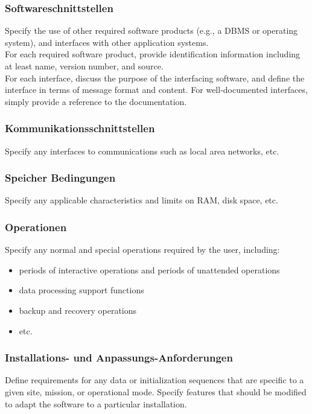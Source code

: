 \subsubsection{Softwareschnittstellen}
Specify the use of other required software products (e.g., a DBMS or operating system), and interfaces with other application systems. \\[-0.3cm]

\noindent For each required software product, provide identification information including at least name, version number, and source. \\[-0.3cm]

\noindent For each interface, discuss the purpose of the interfacing software, and define the interface in terms of message format and content. For well-documented interfaces, simply provide a reference to the documentation. \\[-0.3cm]

\subsubsection{Kommunikationsschnittstellen}
Specify any interfaces to communications such as local area networks, etc.

\subsubsection{Speicher Bedingungen}
Specify any applicable characteristics and limits on RAM, disk space, etc.

\subsubsection{Operationen}
Specify any normal and special operations required by the user, including:
\begin{itemize}
	\item periods of interactive operations and periods of unattended operations
	\item data processing support functions
	\item backup and recovery operations
	\item etc.
\end{itemize}

\subsubsection{Installations- und Anpassungs-Anforderungen}
Define requirements for any data or initialization sequences that are specific to a given site, mission, or operational mode. Specify features that should be modified to adapt the software to a particular installation.

